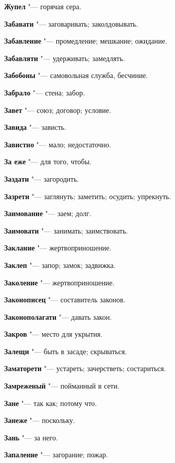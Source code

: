 \begin{mymulticols}
\noindent\textbf{Жупел} "--- горячая сера. 

\bukvaending


\noindent\textbf{Забавати} "--- заговаривать; заколдовывать. 

\noindent\textbf{Забавление} "--- промедление; мешкание; ожидание. 

\noindent\textbf{Забавляти} "--- удерживать; замедлять. 

\noindent\textbf{Забобоны} "--- самовольная служба, бесчиние. 

\noindent\textbf{Забрало} "--- стена; забор. 

\noindent\textbf{Завет} "--- союз; договор; условие. 

\noindent\textbf{Завида} "--- зависть. 

\noindent\textbf{Завистно} "--- мало; недостаточно. 

\noindent\textbf{За еже} "--- для того, чтобы. 

\noindent\textbf{Заздати} "--- загородить. 

\noindent\textbf{Зазрети} "--- заглянуть; заметить; осудить; упрекнуть. 

\noindent\textbf{Заимование} "--- заем; долг. 

\noindent\textbf{Заимовати} "--- занимать; заимствовать. 

\noindent\textbf{Заклание} "--- жертвоприношение. 

\noindent\textbf{Заклеп} "--- запор; замок; задвижка. 

\noindent\textbf{Заколение} "--- жертвоприношение. 

\noindent\textbf{Законописец} "--- составитель законов. 

\noindent\textbf{Законополагати} "--- давать закон. 

\noindent\textbf{Закров} "--- место для укрытия. 

\noindent\textbf{Залещи} "--- быть в засаде; скрываться. 

\noindent\textbf{Заматорети} "--- устареть; зачерстветь; состариться. 

\noindent\textbf{Замреженый} "--- пойманный в сети. 

\noindent\textbf{Зане} "--- так как; потому что. 

\noindent\textbf{Занеже} "--- поскольку. 

\noindent\textbf{Зань} "--- за него. 

\noindent\textbf{Запаление} "--- загорание; пожар. 


\end{mymulticols}

